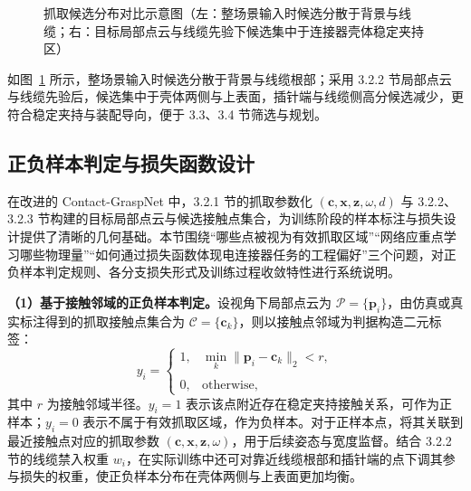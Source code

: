 \begin{figure}[htbp]
  \centering
  \caption{抓取候选分布对比示意图（左：整场景输入时候选分散于背景与线缆；右：目标局部点云与线缆先验下候选集中于连接器壳体稳定夹持区）}
  \label{fig:ch3:graspnet-vis}
\end{figure}

如图~\ref{fig:ch3:graspnet-vis} 所示，整场景输入时候选分散于背景与线缆根部；采用 3.2.2 节局部点云与线缆先验后，候选集中于壳体两侧与上表面，插针端与线缆侧高分候选减少，更符合稳定夹持与装配导向，便于 3.3、3.4 节筛选与规划。

\subsection{正负样本判定与损失函数设计}

在改进的 Contact-GraspNet 中，3.2.1 节的抓取参数化 $(\mathbf{c},\mathbf{x},\mathbf{z},\omega,d)$ 与 3.2.2、3.2.3 节构建的目标局部点云与候选接触点集合，为训练阶段的样本标注与损失设计提供了清晰的几何基础。本节围绕“哪些点被视为有效抓取区域”“网络应重点学习哪些物理量”“如何通过损失函数体现电连接器任务的工程偏好”三个问题，对正负样本判定规则、各分支损失形式及训练过程收敛特性进行系统说明。

\textbf{（1）基于接触邻域的正负样本判定。}设视角下局部点云为 $\mathcal{P}=\{\mathbf{p}_i\}$，由仿真或真实标注得到的抓取接触点集合为 $\mathcal{C}=\{\mathbf{c}_k\}$，则以接触点邻域为判据构造二元标签：
\begin{equation}
  y_i=
  \begin{cases}
  1, & \min_k\|\mathbf{p}_i-\mathbf{c}_k\|_2<r,\\\\
  0, & \text{otherwise},
  \end{cases}
  \label{eq:ch3:pos-neg}
\end{equation}
其中 $r$ 为接触邻域半径。$y_i=1$ 表示该点附近存在稳定夹持接触关系，可作为正样本；$y_i=0$ 表示不属于有效抓取区域，作为负样本。对于正样本点，将其关联到最近接触点对应的抓取参数 $(\mathbf{c},\mathbf{x},\mathbf{z},\omega)$，用于后续姿态与宽度监督。结合 3.2.2 节的线缆禁入权重 $w_i$，在实际训练中还可对靠近线缆根部和插针端的点下调其参与损失的权重，使正负样本分布在壳体两侧与上表面更加均衡。

